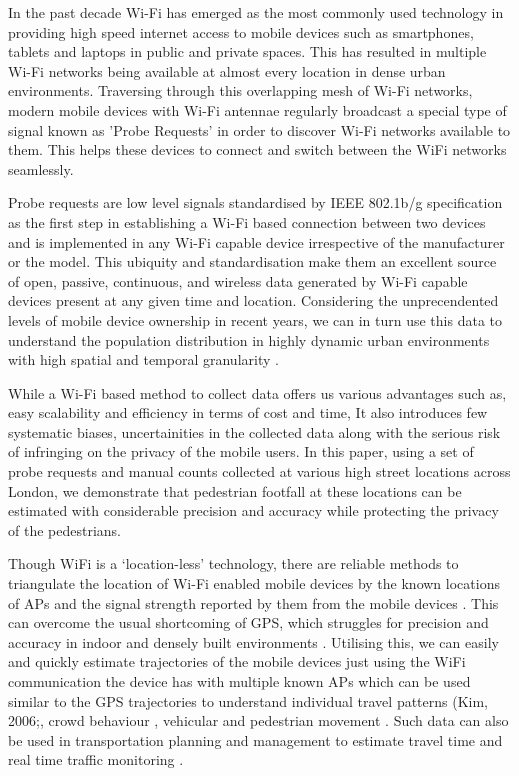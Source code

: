 In the past decade Wi-Fi has emerged as the most commonly used technology in providing high speed internet access to mobile devices such as smartphones, tablets and laptops in public and private spaces. This has resulted in multiple Wi-Fi networks being available at almost every location in dense urban environments. Traversing through this overlapping mesh of Wi-Fi networks, modern mobile devices with Wi-Fi antennae regularly broadcast a special type of signal known as 'Probe Requests' in order to discover Wi-Fi networks available to them. This helps these devices to connect and switch between the WiFi networks seamlessly.

Probe requests are low level signals standardised by IEEE 802.1b/g specification \citep{ieee2013} as the first step in establishing a Wi-Fi based connection between two devices and is implemented in any Wi-Fi capable device irrespective of the manufacturer or the model. This ubiquity and standardisation make them an excellent source of open, passive, continuous, and wireless data generated by Wi-Fi capable devices present at any given time and location. Considering the unprecendented levels of mobile device ownership in recent years, we can in turn use this data to understand the population distribution in highly dynamic urban environments with high spatial and temporal granularity \citep{freud2015,konto2017}.

While a Wi-Fi based method to collect data offers us various advantages such as, easy scalability and efficiency in terms of cost and time, It also introduces few systematic biases, uncertainities in the collected data along with the serious risk of infringing on the privacy of the mobile users. In this paper, using a set of probe requests and manual counts collected at various high street locations across London, we demonstrate that pedestrian footfall at these locations can be estimated with considerable precision and accuracy while protecting the privacy of the pedestrians.

Though WiFi is a `location-less' technology, there are reliable methods to triangulate the location of Wi-Fi enabled mobile devices by the known locations of APs and the signal strength reported by them from the mobile devices \citep{he2003range, moore2004robust, lamarca2005place}.
This can overcome the usual shortcoming of GPS, which struggles for precision and accuracy in indoor and densely built environments \citep{zarim2006,kawaguchi2009wifi, xi2010locating}. 
Utilising this, we can easily and quickly estimate trajectories of the mobile devices just using the WiFi communication the device has with multiple known APs \citep{Sorensenlocation} which can be used similar to the GPS trajectories to understand individual travel patterns (Kim, 2006;\citep{reki2007,Sap2015}, crowd behaviour \citep{abedi2013bluetooth,mowafi2013tracking}, vehicular \citep{lu2010vehicle} and pedestrian movement \citep{xu2013pedestrian,fukuzaki2014pedestrian,wang2016gait}.
Such data can also be used in transportation planning and management to estimate travel time \citep{musa2011wiflow} and real time traffic monitoring \citep{abbott2013empirical}.

